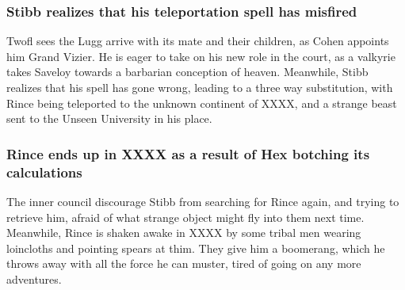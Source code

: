 \subsubsection{\Gls{Stibb} realizes that his teleportation spell has misfired}
\Gls{Twofl} sees the \Gls{Lugg} arrive with its mate and their children, as \Gls{Cohen} appoints him
Grand Vizier. He is eager to take on his new role in the court, as a valkyrie takes \Gls{Saveloy}
towards a barbarian conception of heaven. Meanwhile, \Gls{Stibb} realizes that his spell has gone
wrong, leading to a three way substitution, with \Gls{Rince} being teleported to the unknown
continent of XXXX, and a strange beast sent to the Unseen University in his place.

\subsubsection{\Gls{Rince} ends up in XXXX as a result of \Gls{Hex} botching its calculations}
The inner council discourage \Gls{Stibb} from searching for \Gls{Rince} again, and trying to
retrieve him, afraid of what strange object might fly into them next time. Meanwhile, \Gls{Rince}
is shaken awake in XXXX by some tribal men wearing loincloths and pointing spears at thim. They
give him a boomerang, which he throws away with all the force he can muster, tired of going on any
more adventures.
